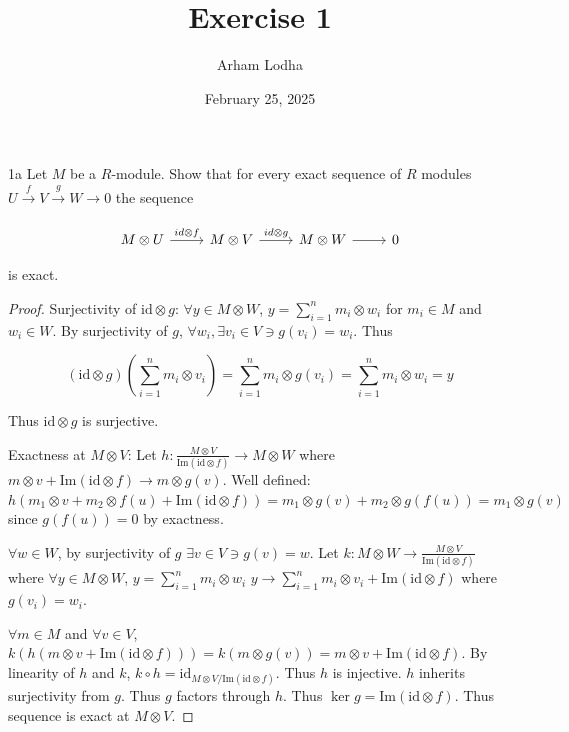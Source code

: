 \documentclass{article}
\newcommand*{\id}{\mathrm{id}}
\newcommand{\IM}[1]{\text{Im}(#1)}
\begin{document}
\title{Exercise 1}
\author{Arham Lodha}%
\date{February 25, 2025}%
\maketitle

\begin{PROB}{1a}\label{Problem 1a.}
    Let $M$ be a $R$-module. Show that for every exact sequence of $R$ modules $U \xrightarrow[]{f} V \xrightarrow[]{g} W \xrightarrow{} 0$ the sequence 
    
    \[\begin{tikzcd}
	{M \otimes U} & {M \otimes V} & {M \otimes W} & 0
	\arrow["{id \otimes f}", from=1-1, to=1-2]
	\arrow["{id \otimes g}", from=1-2, to=1-3]
	\arrow[from=1-3, to=1-4]
\end{tikzcd}\]

    is exact.
\end{PROB}
\begin{proof}
    Surjectivity of $\id \otimes g$: $\forall y \in M \otimes W$, $y = \sum_{i = 1}^{n} m_i \otimes w_i$ for $m_i \in M$ and $w_i \in W$. By surjectivity of $g$, $\forall w_i, \exists v_i \in V \ni g(v_i)= w_i$. Thus 
    
    \[(\id \otimes g)\left(\sum_{i = 1}^{n} m_i \otimes v_i \right) = \sum_{i = 1}^n m_i \otimes g(v_i) = \sum_{i = 1}^n m_i \otimes w_i = y\]


    Thus $\id \otimes g$ is surjective. 
    
    
    Exactness at $M \otimes V$: Let $h: \frac{M \otimes V}{\IM{\id \otimes f}} \to M \otimes W$ where $m \otimes v + \IM{\id \otimes f} \to m \otimes g(v)$. Well defined: $h(m_1 \otimes v + m_2 \otimes f(u) + \IM{\id \otimes f}) = m_1 \otimes g(v) + m_2 \otimes g(f(u)) = m_1 \otimes g(v)$ since $g(f(u)) = 0$ by exactness.    
    
    $\forall w \in W$, by surjectivity of $g$ $\exists v \in V \ni g(v) = w$.     
    Let $k: M \otimes W \to \frac{M \otimes V}{\IM{\id \otimes f}}$ where $\forall y \in M \otimes W$, $y = \sum_{i = 1}^{n} m_i \otimes w_i$ $y \to \sum_{i = 1}^n m_i \otimes v_i + \IM{\id \otimes f}$ where $g(v_i) = w_i$. 
    
    
    $\forall m \in M$ and $\forall v \in V$, $k(h(m \otimes v + \IM{\id \otimes f})) = k(m \otimes g(v)) = m \otimes v + \IM{\id \otimes f}$. By linearity of $h$ and $k$, $k \circ h = \id_{M \otimes V / \IM{\id \otimes f}}$. Thus $h$ is injective. $h$ inherits surjectivity from $g$.    Thus $g$ factors through $h$. Thus $\ker g = \IM{\id \otimes f}$. Thus sequence is exact at $M \otimes V$.         
\end{proof}
\end{document}
